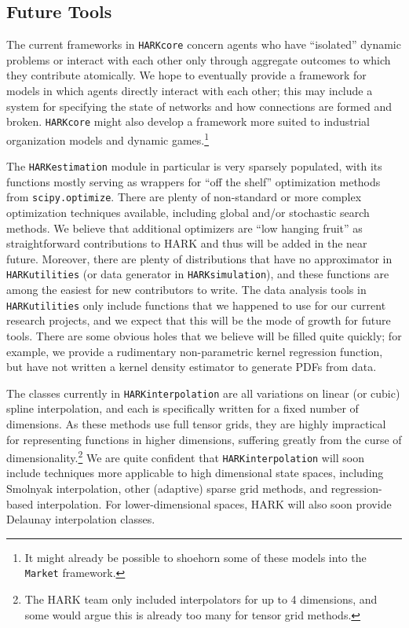 \documentclass[12pt,titlepage,letterpaper]{econtex}
\begin{document}
\subsection{Future Tools}\label{sec:FutureTools}

The current frameworks in \texttt{HARKcore} concern agents who have ``isolated'' dynamic problems or interact with each other only through aggregate outcomes to which they contribute atomically.  We hope to eventually provide a framework for models in which agents directly interact with each other; this may include a system for specifying the state of networks and how connections are formed and broken.  \texttt{HARKcore} might also develop a framework more suited to industrial organization models and dynamic games.\footnote{It might already be possible to shoehorn some of these models into the \texttt{Market} framework.}

The \texttt{HARKestimation} module in particular is very sparsely populated, with its functions mostly serving as wrappers for ``off the shelf'' optimization methods from \texttt{scipy.optimize}.  There are plenty of non-standard or more complex optimization techniques available, including global and/or stochastic search methods.  We believe that additional optimizers are ``low hanging fruit'' as straightforward contributions to HARK and thus will be added in the near future.  Moreover, there are plenty of distributions that have no approximator in \texttt{HARKutilities} (or data generator in \texttt{HARKsimulation}), and these functions are among the easiest for new contributors to write.  The data analysis tools in \texttt{HARKutilities} only include functions that we happened to use for our current research projects, and we expect that this will be the mode of growth for future tools.  There are some obvious holes that we believe will be filled quite quickly; for example, we provide a rudimentary non-parametric kernel regression function, but have not written a kernel density estimator to generate PDFs from data.

The classes currently in \texttt{HARKinterpolation} are all variations on linear (or cubic) spline interpolation, and each is specifically written for a fixed number of dimensions.  As these methods use full tensor grids, they are highly impractical for representing functions in higher dimensions, suffering greatly from the curse of dimensionality.\footnote{The HARK team only included interpolators for up to 4 dimensions, and some would argue this is already too many for tensor grid methods.}  We are quite confident that \texttt{HARKinterpolation} will soon include techniques more applicable to high dimensional state spaces, including Smolnyak interpolation, other (adaptive) sparse grid methods, and regression-based interpolation.  For lower-dimensional spaces, HARK will also soon provide Delaunay interpolation classes.
\end{document}
